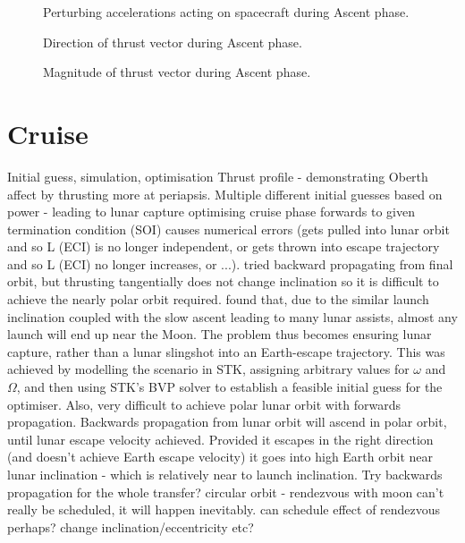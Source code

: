 \begin{figure}
\centering
\def\svgwidth{\figurewidth}

\caption{Perturbing accelerations acting on spacecraft during Ascent phase.}
\label{fig:Ascent-pert2}
\end{figure}

\begin{figure}
\centering
\def\svgwidth{\figurewidth}

\caption{Direction of thrust vector during Ascent phase.}
\label{fig:Ascent-thrust}
\end{figure}

\begin{figure}
\centering
\def\svgwidth{\figurewidth}

\caption{Magnitude of thrust vector during Ascent phase.}
\label{fig:Ascent-thrustM}
\end{figure}


\clearpage

\section{Cruise}
Initial guess, simulation, optimisation
Thrust profile - demonstrating Oberth affect by thrusting more at periapsis.
Multiple different initial guesses based on power - leading to lunar capture
optimising cruise phase forwards to given termination condition (SOI) causes numerical errors (gets pulled into lunar orbit and so L (ECI) is no longer independent, or gets thrown into escape trajectory and so L (ECI) no longer increases, or ...).
tried backward propagating from final orbit, but thrusting tangentially does not change inclination so it is difficult to achieve the nearly polar orbit required.
found that, due to the similar launch inclination coupled with the slow ascent leading to many lunar assists, almost any launch will end up near the Moon. The problem thus becomes ensuring lunar capture, rather than a lunar slingshot into an Earth-escape trajectory. This was achieved by modelling the scenario in STK, assigning arbitrary values for $\omega$ and $\Omega$, and then using STK's BVP solver to establish a feasible initial guess for the optimiser. 
Also, very difficult to achieve polar lunar orbit with forwards propagation. Backwards propagation from lunar orbit will ascend in polar orbit, until lunar escape velocity achieved. Provided it escapes in the right direction (and doesn't achieve Earth escape velocity) it goes into high Earth orbit near lunar inclination - which is relatively near to launch inclination. Try backwards propagation for the whole transfer?
circular orbit - rendezvous with moon can't really be scheduled, it will happen inevitably. can schedule effect of rendezvous perhaps? change inclination/eccentricity etc?

